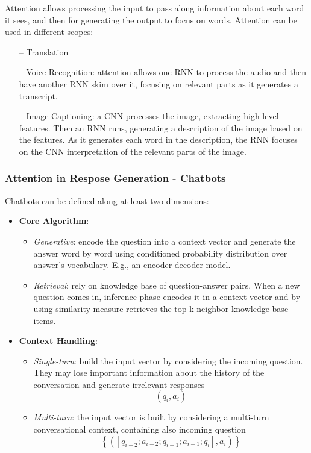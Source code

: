 Attention allows processing the input to pass along information about each word it sees, and then for generating the output to focus on words.
Attention can be used in different scopes:
\begin{itemize}
    \item[--] Translation
    \item[--] Voice Recognition: attention allows one RNN to process the audio and then have another RNN skim over it, focusing on relevant parts as it generates a transcript.
    \item[--] Image Captioning: a CNN processes the image, extracting high-level features. Then an RNN runs, generating a description of the image based on the features. As it generates each word in the description, the RNN focuses on the CNN interpretation of the relevant parts of the image.
\end{itemize}{}

\subsubsection{Attention in Respose Generation - Chatbots}
Chatbots can be defined along at least two dimensions:
\begin{itemize}
    \item \textbf{Core Algorithm}:
    \begin{itemize}
        \item \textit{Generative}: encode the question into a context vector and generate the answer word by word using conditioned probability distribution over answer’s vocabulary. E.g., an encoder-decoder model.
        
        \item \textit{Retrieval}: rely on knowledge base of question-answer pairs. When a new question comes in, inference phase encodes it in a context vector and by using similarity measure retrieves the top-k neighbor knowledge base items.
    \end{itemize}{}
    
    \item \textbf{Context Handling}:
    \begin{itemize}
        \item \textit{Single-turn}: build the input vector by considering the incoming question. They may lose important information about the history of the conversation and generate irrelevant responses
        $$ {(q_i, a_i)}$$
        
        \item \textit{Multi-turn}: the input vector is built by considering a multi-turn conversational context, containing also incoming question  
        $$
        \left\{\left(\left[q_{i-2} ; a_{i-2} ; q_{i-1} ; a_{i-1} ; q_{i}\right], a_{i}\right)\right\}
        $$
    \end{itemize}{}
\end{itemize}{}


